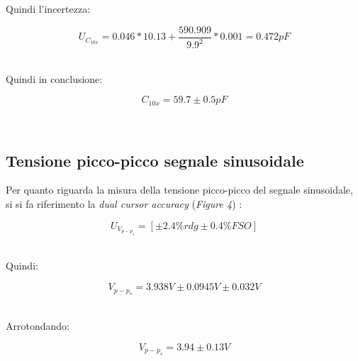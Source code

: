 \documentclass[a4paper]{article}
\begin{document}
Quindi l'incertezza:
\begin{Large}
	\begin{equation}
		{U_{C_{10x}}}= 0.046*10.13+\frac{590.909}{9.9^2}*0.001=0.472 pF
	\end{equation}
\end{Large}\\

Quindi in conclusione:
\begin{Large}
	\begin{equation}
		{C_{10x}}= 59.7 \pm0.5 pF
	\end{equation}
\end{Large}\\

\subsection{Tensione picco-picco segnale sinusoidale} 
Per quanto riguarda la misura della tensione picco-picco del segnale sinusoidale, si si fa riferimento la \emph{dual cursor accuracy} (\emph{Figure 4}) :

\begin{Large}
	\begin{equation}
		U_{V_{p-p_{s}}}= [\pm 2.4\% rdg\pm 0.4\%FSO]
	\end{equation}
\end{Large}\\

Quindi: 
\begin{Large}
	\begin{equation}
		V_{p-p_{s}}= 3.938V\pm 0.0945V\pm 0.032V
	\end{equation}
\end{Large}\\

Arrotondando:
\begin{Large}
	\begin{equation}
		V_{p-p_{s}}= 3.94\pm 0.13V
\end{equation}
\end{Large}\\
\end{document}
